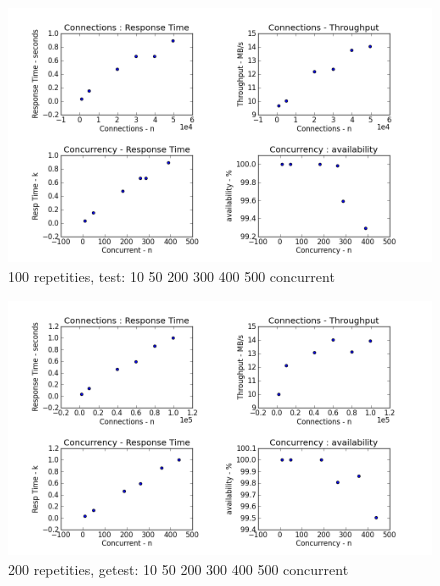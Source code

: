 \documentclass[10pt,a4paper]{beamer}
\begin{document}
\begin{frame}
\begin{figure}
\includegraphics[scale=0.4]{siege_100r.png}
\caption{100 repetities, test: 10 50 200 300 400 500 concurrent}
\end{figure}
\end{frame}

\begin{frame}
\begin{figure}
\includegraphics[scale=0.4]{siege_200r.png}
\caption{200 repetities, getest: 10 50 200 300 400 500 concurrent}
\end{figure}
\end{frame}
\end{document}
